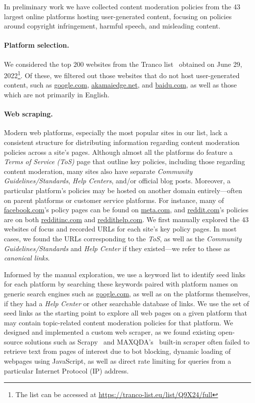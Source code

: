 In preliminary work we have collected content moderation policies from the 43
largest online platforms hosting user-generated content, focusing on policies
around copyright infringement, harmful speech, and misleading content.
\paragraph{Platform selection.} We considered the top $200$ websites from the Tranco
list~\cite{LePochat2019} obtained on June 29, 2022\footnote{The list can be accessed at
\url{https://tranco-list.eu/list/Q9X24/full}}. Of these, we filtered out those
websites that do not host user-generated content, such as \url{google.com},
\url{akamaiedge.net}, and \url{baidu.com}, as well as those which 
are not primarily in English.

\paragraph{Web scraping.} 
Modern web platforms, especially the
most popular sites in our list, lack a consistent structure for distributing
information regarding content moderation policies across a site's
pages. 
Although almost all the platforms do feature a \textit{Terms of Service (ToS)} page
that outline key policies, including those regarding content moderation, many
sites also have separate \textit{Community Guidelines/Standards}, \textit{Help Centers}, and/or
official blog posts. Moreover, a particular platform's policies may be hosted on
another domain entirely---often on parent platforms or customer service
platforms. For instance, many of \url{facebook.com}'s policy pages can be found
on \url{meta.com}, and \url{reddit.com}'s policies are on both
\url{redditinc.com} and \url{reddithelp.com}. We first manually explored the
43 websites of focus and recorded URLs for each site's key policy pages. In most
cases, we found the URLs corresponding to the \textit{ToS}, as well as the \textit{Community
Guidelines/Standards} and \textit{Help Center} if they existed---we refer to these as
\emph{canonical links}.

Informed by the manual exploration, we use a keyword list to identify seed links for each platform by searching these keywords paired with platform names on generic search engines such as \url{google.com}, as well as on the
platforms themselves, if they had a \emph{Help Center} or other searchable database
of links.
We use the set of seed links as the
starting point to explore all web pages on a given platform that may contain topic-related content moderation policies for
that platform. We designed and implemented a custom web scraper, as we found existing open-source
solutions such as Scrapy~\cite{scrapy} and MAXQDA's~\cite{maxqda} built-in
scraper often failed to retrieve text from pages of interest due to bot
blocking, dynamic loading of webpages using JavaScript, as well as direct rate
limiting for queries from a particular Internet Protocol (IP) address.

